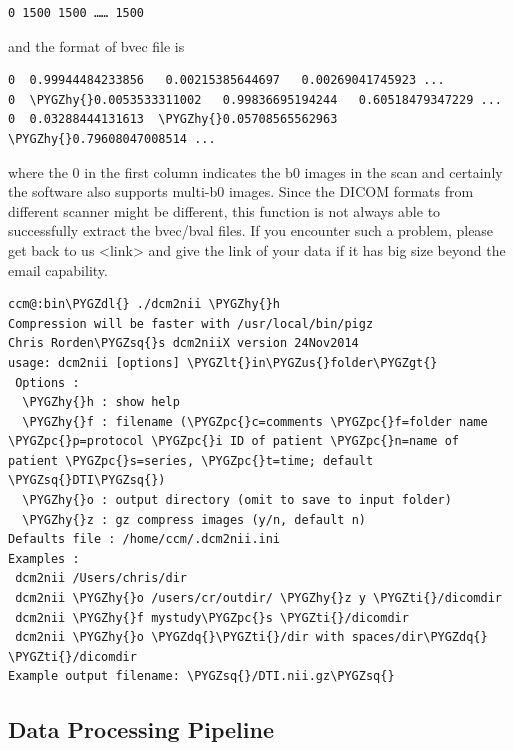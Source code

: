 \documentclass[letterpaper,10pt,english]{sphinxmanual}
\def\PYGZus{\char`\_}
\def\PYGZlt{\char`\<}
\def\PYGZgt{\char`\>}
\def\PYGZpc{\char`\%}
\def\PYGZdl{\char`\$}
\def\PYGZhy{\char`\-}
\def\PYGZsq{\char`\'}
\def\PYGZdq{\char`\"}
\def\PYGZti{\char`\~}
\renewcommand\PYGZsq{\textquotesingle}
\begin{document}
\begin{Verbatim}[commandchars=\\\{\}]
0 1500 1500 …… 1500
\end{Verbatim}

and the format of bvec file is

\begin{Verbatim}[commandchars=\\\{\}]
0  0.99944484233856   0.00215385644697   0.00269041745923 ...
0  \PYGZhy{}0.0053533311002   0.99836695194244   0.60518479347229 ...
0  0.03288444131613  \PYGZhy{}0.05708565562963   \PYGZhy{}0.79608047008514 ...
\end{Verbatim}

where the 0 in the first column indicates the b0 images in the scan and certainly the software also supports multi-b0 images. Since the DICOM formats from different scanner might be different, this function is not always able to successfully extract the bvec/bval files. If you encounter such a problem, please get back to us \textless{}link\textgreater{} and give the link of your data if it has big size beyond the email capability.

\begin{Verbatim}[commandchars=\\\{\}]
ccm@:bin\PYGZdl{} ./dcm2nii \PYGZhy{}h
Compression will be faster with /usr/local/bin/pigz
Chris Rorden\PYGZsq{}s dcm2niiX version 24Nov2014
usage: dcm2nii [options] \PYGZlt{}in\PYGZus{}folder\PYGZgt{}
 Options :
  \PYGZhy{}h : show help
  \PYGZhy{}f : filename (\PYGZpc{}c=comments \PYGZpc{}f=folder name \PYGZpc{}p=protocol \PYGZpc{}i ID of patient \PYGZpc{}n=name of patient \PYGZpc{}s=series, \PYGZpc{}t=time; default \PYGZsq{}DTI\PYGZsq{})
  \PYGZhy{}o : output directory (omit to save to input folder)
  \PYGZhy{}z : gz compress images (y/n, default n)
Defaults file : /home/ccm/.dcm2nii.ini
Examples :
 dcm2nii /Users/chris/dir
 dcm2nii \PYGZhy{}o /users/cr/outdir/ \PYGZhy{}z y \PYGZti{}/dicomdir
 dcm2nii \PYGZhy{}f mystudy\PYGZpc{}s \PYGZti{}/dicomdir
 dcm2nii \PYGZhy{}o \PYGZdq{}\PYGZti{}/dir with spaces/dir\PYGZdq{} \PYGZti{}/dicomdir
Example output filename: \PYGZsq{}/DTI.nii.gz\PYGZsq{}
\end{Verbatim}


\subsection{Data Processing Pipeline}
\label{userguide::doc}\label{userguide:data-processing-pipeline}
\end{document}
